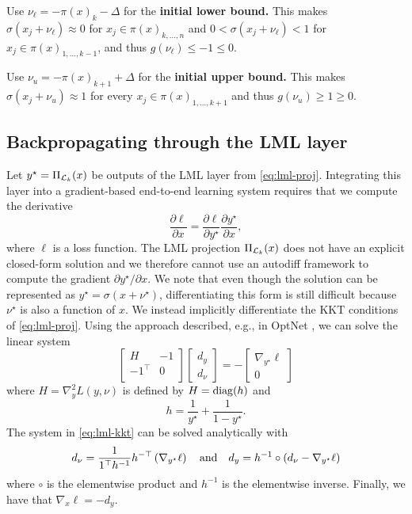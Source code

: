 Use $\nu_\ell = -\pi(x)_k-\Delta$ for the \textbf{initial lower bound.}
This makes $\sigma(x_j+ \nu_\ell)\approx 0$ for $x_j\in \pi(x)_{k,\ldots,n}$
and $0<\sigma(x_j+ \nu_\ell)<1$ for $x_j\in \pi(x)_{1,\ldots,k-1}$,
and thus $g(\nu_\ell) \leq -1 \leq 0$.

Use $\nu_u = -\pi(x)_{k+1}+\Delta$ for the \textbf{initial upper bound.}
This makes $\sigma(x_j + \nu_u)\approx 1$ for every
$x_j \in \pi(x)_{1,\ldots,k+1}$ and thus
$g(\nu_u) \geq 1 \geq 0$.

\subsection{Backpropagating through the LML layer}
\label{sec:lml:lml:backprop}
Let $y^\star = \Pi_{\mathcal{L}_k}(x)$ be outputs of the LML layer
from \cref{eq:lml-proj}.
Integrating this layer into a gradient-based
end-to-end learning system requires that we
compute the derivative
$$
\frac{\partial\ell}{\partial x} =
\frac{\partial\ell}{\partial y^\star}
\frac{\partial y^\star}{\partial x},
$$
where $\ell$ is a loss function.
The LML projection $\Pi_{\mathcal{L}_k}(x)$ does not have an explicit
closed-form solution and we therefore cannot use an
autodiff framework to compute the gradient
$\partial y^\star/\partial x$.
We note that even though the solution can be represented as
$y^\star = \sigma(x+\nu^\star)$,
differentiating this form is still difficult because
$\nu^\star$ is also a function of $x$.
We instead implicitly differentiate the KKT conditions
of \cref{eq:lml-proj}.
Using the approach described, e.g., in OptNet \citep{amos2017optnet},
we can solve the linear system
\begin{equation}
\label{eq:lml-kkt}
\begin{bmatrix}
H & -1 \\
-1^\top & 0 \\
\end{bmatrix}
\begin{bmatrix}
d_y \\ d_\nu
\end{bmatrix}
=
-
\begin{bmatrix}
\nabla_{y^\star}\ell \\ 0
\end{bmatrix}
\end{equation}
where $H=\nabla^2_y L(y,\nu)$ is defined by $H={\rm diag}(h)$ and
\begin{equation}
  h=\frac{1}{y^\star}+\frac{1}{1-y^\star}.
\end{equation}
The system in \cref{eq:lml-kkt} can be solved
analytically with
\begin{equation}
  d_\nu = \frac{1}{1^\top h^{-1}} h^{-\top}\left(\nabla_{y^\star} \ell\right)
  \quad
  {\rm and}
  \quad
  d_y = h^{-1}\circ(d_\nu -\nabla_{y^\star}\ell)
\end{equation}
where $\circ$ is the elementwise product
and $h^{-1}$ is the elementwise inverse.
Finally, we have that
$\nabla_x \ell = -d_y$.

